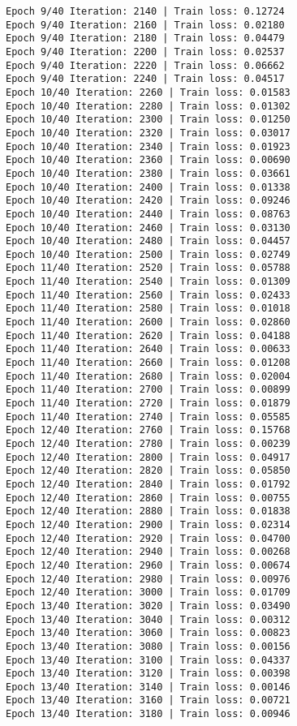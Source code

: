 \documentclass[11pt]{article}
\begin{document}
\begin{Verbatim}[commandchars=\\\{\}]
Epoch 9/40 Iteration: 2140 | Train loss: 0.12724
Epoch 9/40 Iteration: 2160 | Train loss: 0.02180
Epoch 9/40 Iteration: 2180 | Train loss: 0.04479
Epoch 9/40 Iteration: 2200 | Train loss: 0.02537
Epoch 9/40 Iteration: 2220 | Train loss: 0.06662
Epoch 9/40 Iteration: 2240 | Train loss: 0.04517
Epoch 10/40 Iteration: 2260 | Train loss: 0.01583
Epoch 10/40 Iteration: 2280 | Train loss: 0.01302
Epoch 10/40 Iteration: 2300 | Train loss: 0.01250
Epoch 10/40 Iteration: 2320 | Train loss: 0.03017
Epoch 10/40 Iteration: 2340 | Train loss: 0.01923
Epoch 10/40 Iteration: 2360 | Train loss: 0.00690
Epoch 10/40 Iteration: 2380 | Train loss: 0.03661
Epoch 10/40 Iteration: 2400 | Train loss: 0.01338
Epoch 10/40 Iteration: 2420 | Train loss: 0.09246
Epoch 10/40 Iteration: 2440 | Train loss: 0.08763
Epoch 10/40 Iteration: 2460 | Train loss: 0.03130
Epoch 10/40 Iteration: 2480 | Train loss: 0.04457
Epoch 10/40 Iteration: 2500 | Train loss: 0.02749
Epoch 11/40 Iteration: 2520 | Train loss: 0.05788
Epoch 11/40 Iteration: 2540 | Train loss: 0.01309
Epoch 11/40 Iteration: 2560 | Train loss: 0.02433
Epoch 11/40 Iteration: 2580 | Train loss: 0.01018
Epoch 11/40 Iteration: 2600 | Train loss: 0.02860
Epoch 11/40 Iteration: 2620 | Train loss: 0.04188
Epoch 11/40 Iteration: 2640 | Train loss: 0.00633
Epoch 11/40 Iteration: 2660 | Train loss: 0.01208
Epoch 11/40 Iteration: 2680 | Train loss: 0.02004
Epoch 11/40 Iteration: 2700 | Train loss: 0.00899
Epoch 11/40 Iteration: 2720 | Train loss: 0.01879
Epoch 11/40 Iteration: 2740 | Train loss: 0.05585
Epoch 12/40 Iteration: 2760 | Train loss: 0.15768
Epoch 12/40 Iteration: 2780 | Train loss: 0.00239
Epoch 12/40 Iteration: 2800 | Train loss: 0.04917
Epoch 12/40 Iteration: 2820 | Train loss: 0.05850
Epoch 12/40 Iteration: 2840 | Train loss: 0.01792
Epoch 12/40 Iteration: 2860 | Train loss: 0.00755
Epoch 12/40 Iteration: 2880 | Train loss: 0.01838
Epoch 12/40 Iteration: 2900 | Train loss: 0.02314
Epoch 12/40 Iteration: 2920 | Train loss: 0.04700
Epoch 12/40 Iteration: 2940 | Train loss: 0.00268
Epoch 12/40 Iteration: 2960 | Train loss: 0.00674
Epoch 12/40 Iteration: 2980 | Train loss: 0.00976
Epoch 12/40 Iteration: 3000 | Train loss: 0.01709
Epoch 13/40 Iteration: 3020 | Train loss: 0.03490
Epoch 13/40 Iteration: 3040 | Train loss: 0.00312
Epoch 13/40 Iteration: 3060 | Train loss: 0.00823
Epoch 13/40 Iteration: 3080 | Train loss: 0.00156
Epoch 13/40 Iteration: 3100 | Train loss: 0.04337
Epoch 13/40 Iteration: 3120 | Train loss: 0.00398
Epoch 13/40 Iteration: 3140 | Train loss: 0.00146
Epoch 13/40 Iteration: 3160 | Train loss: 0.00721
Epoch 13/40 Iteration: 3180 | Train loss: 0.00946

\end{Verbatim}
\end{document}
